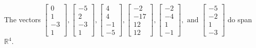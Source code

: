 \begin{exercise}
\begin{exerciseStatement}
  \end{exerciseStatement}
  \begin{exerciseAnswer}
   The vectors \(\left[\begin{array}{r}
0 \\
1 \\
-3 \\
1
\end{array}\right] , \left[\begin{array}{r}
-5 \\
2 \\
-3 \\
1
\end{array}\right] , \left[\begin{array}{r}
4 \\
4 \\
-1 \\
-5
\end{array}\right] , \left[\begin{array}{r}
-2 \\
-17 \\
12 \\
12
\end{array}\right] , \left[\begin{array}{r}
-2 \\
-4 \\
1 \\
-1
\end{array}\right] , \text{ and } \left[\begin{array}{r}
-5 \\
-2 \\
1 \\
-3
\end{array}\right]\) 
  	 do  
	span \(\mathbb{R}^4\).
  


  \end{exerciseAnswer}
\end{exercise}